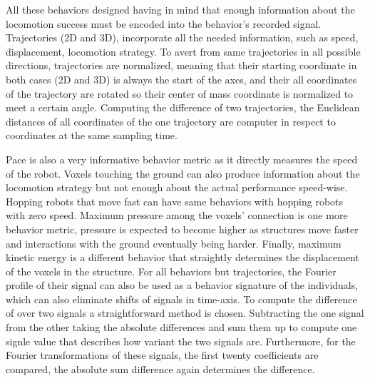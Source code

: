 All these behaviors designed having in mind that enough information about the locomotion success must be encoded into the behavior's recorded signal. Trajectories (2D and 3D), incorporate all the needed information, such as speed, displacement, locomotion strategy. To avert from same trajectories in all possible directions, trajectories are normalized, meaning that their starting coordinate in both cases (2D and 3D) is always the start of the axes, and their all coordinates of the trajectory are rotated so their center of mass coordinate is normalized to meet a certain angle. Computing the difference of two trajectories, the Euclidean distances of all coordinates of the one trajectory are computer in respect to coordinates at the same sampling time.

Pace is also a very informative behavior metric as it directly measures the speed of the robot. Voxels touching the ground can also produce information about the locomotion strategy but not enough about the actual performance speed-wise. Hopping robots that move fast can have same behaviors with hopping robots with zero speed. Maximum pressure among the voxels' connection is one more behavior metric, pressure is expected to become higher as structures move faster and interactions with the ground eventually being harder. Finally, maximum kinetic energy is a different behavior that straightly determines the displacement of the voxels in the structure. For all behaviors but trajectories, the Fourier profile of their signal can also be used as a behavior signature of the individuals, which can also eliminate shifts of signals in time-axis. To compute the difference of over two signals a straightforward method is chosen. Subtracting the one signal from the other taking the absolute differences and sum them up to compute one signle value that describes how variant the two signals are. Furthermore, for the Fourier transformations of these signals, the first twenty coefficients are compared, the absolute sum difference again determines the difference.